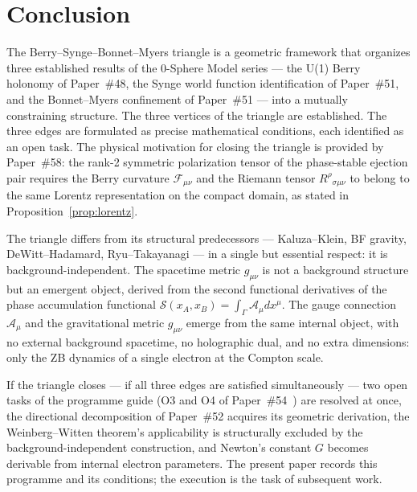 \documentclass[%
 reprint, amsmath,amssymb, aps, prd, ]{revtex4-2}
\numberwithin{equation}{section}
\newcommand{\BerryA}{\mathcal{A}}
\newcommand{\BerryF}{\mathcal{F}}
\newcommand{\SyngeS}{\mathcal{S}}
\begin{document}
\section{Conclusion}
\label{sec:conclusion}

The Berry--Synge--Bonnet--Myers triangle is a geometric framework that organizes three established results of the 0-Sphere Model series --- the U(1) Berry holonomy of Paper~\#48, the Synge world function identification of Paper~\#51, and the Bonnet--Myers confinement of Paper~\#51 --- into a mutually constraining structure.
The three vertices of the triangle are established.
The three edges are formulated as precise mathematical conditions, each identified as an open task.
The physical motivation for closing the triangle is provided by Paper~\#58: the rank-2 symmetric polarization tensor of the phase-stable ejection pair requires the Berry curvature $\BerryF_{\mu\nu}$ and the Riemann tensor $R^\rho{}_{\sigma\mu\nu}$ to belong to the same Lorentz representation on the compact domain, as stated in Proposition~\ref{prop:lorentz}.

The triangle differs from its structural predecessors --- Kaluza--Klein, BF gravity, DeWitt--Hadamard, Ryu--Takayanagi --- in a single but essential respect: it is background-independent.
The spacetime metric $g_{\mu\nu}$ is not a background structure but an emergent object, derived from the second functional derivatives of the phase accumulation functional $\SyngeS(x_A,x_B) = \int_\Gamma \BerryA_\mu dx^\mu$.
The gauge connection $\BerryA_\mu$ and the gravitational metric $g_{\mu\nu}$ emerge from the same internal object, with no external background spacetime, no holographic dual, and no extra dimensions: only the ZB dynamics of a single electron at the Compton scale.

If the triangle closes --- if all three edges are satisfied simultaneously --- two open tasks of the programme guide (O3 and O4 of Paper~\#54~\cite{hanamura54}) are resolved at once, the directional decomposition of Paper~\#52 acquires its geometric derivation, the Weinberg--Witten theorem's applicability is structurally excluded by the background-independent construction, and Newton's constant $G$ becomes derivable from internal electron parameters.
The present paper records this programme and its conditions; the execution is the task of subsequent work.
\end{document}
